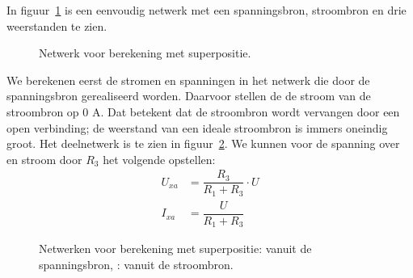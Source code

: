 In figuur~\ref{fig:gelnetwerkvoorsuperpositiebeginsel} is een eenvoudig
netwerk met een spanningsbron, stroombron en drie weerstanden te zien.

\begin{figure}[!ht]
\centering
{}
\caption{Netwerk voor berekening met superpositie.}
\label{fig:gelnetwerkvoorsuperpositiebeginsel}
\end{figure}

We berekenen eerst de stromen en spanningen in het netwerk die door de
spanningsbron gerealiseerd worden. Daarvoor stellen de de stroom van de
stroombron op 0 A. Dat betekent dat de stroombron wordt vervangen door
een open verbinding; de weerstand van een ideale stroombron is immers
oneindig groot. Het deelnetwerk is te zien in
figuur~\ref{fig:gelnetwerkvoorsuperpositiebeginselsplita}. We kunnen
voor de spanning over en stroom door $R_3$ het volgende opstellen:
%
\begin{equation}
\begin{split}
U_{xa} &= \dfrac{R_3}{R_1+R_3}\cdot U \\
I_{xa} &= \dfrac{U}{R_1+R_3}
\end{split}
\end{equation}

\begin{figure}[!ht]
\centering
\begin{subfigure}{0.48\textwidth}
\centering
{}
\caption{}
\label{fig:gelnetwerkvoorsuperpositiebeginselsplita}
\end{subfigure}\hfill%
\begin{subfigure}{0.48\textwidth}
\centering
{}
\caption{}
\label{fig:gelnetwerkvoorsuperpositiebeginselsplitb}
\end{subfigure}
\captionsetup{width=0.8\textwidth}
\caption{Netwerken voor berekening met superpositie:  vanuit de spanningsbron, : vanuit de stroombron.}
\end{figure}

